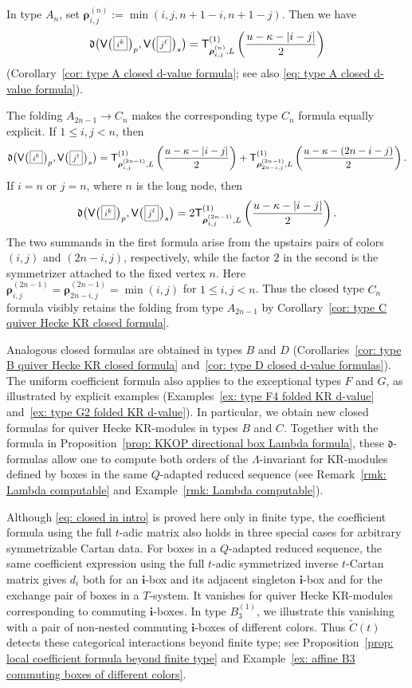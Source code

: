 \documentclass[12pt, leqno]{amsart}
\numberwithin{equation}{section}
\theoremstyle{plain}
\theoremstyle{definition}
\newcommand{\Vkm}[1]{%
  \ttV\bigl(\hspace{0.2ex}\scalebox{.8}{\(\boxed{#1}\)}\hspace{0.2ex}\bigr)%
}
\newcommand{\seteq}{\mathbin{:=}}
\newcommand{\de}{\mathfrak{d}}
\newcommand{\tC}{\widetilde{C}}
\newcommand{\sfT}{\mathsf{T}}
\newcommand{\brho}{{\boldsymbol{\rho}}}
\newcommand{\bfi}{\mathbf{i}}
\newcommand{\ttV}{\mathtt{V}}
\begin{document}
In type \(A_n\), set
\(\brho^{(n)}_{i,j}\seteq\min(i,j,n+1-i,n+1-j)\).
Then we have
\[
\de\bigl(\Vkm{i^k}_p,\Vkm{j^\ell}_s\bigr)
= \sfT^{(1)}_{\brho^{(n)}_{i,j},L} \left( \frac{u-\kappa-|i-j|}{2} \right)
\]
(Corollary~\ref{cor: type A closed d-value formula}; see
also \eqref{eq: type A closed d-value formula}).

The folding \(A_{2n-1}\longrightarrow C_n\) makes the corresponding
type \(C_n\) formula equally explicit. 
If \(1\leq i,j<n\), then
\[ 
\de\bigl(\Vkm{i^k}_p,\Vkm{j^\ell}_s\bigr)
=\sfT^{(1)}_{\brho^{(2n-1)}_{i,j},L}
\left( \frac{u-\kappa-|i-j|}{2} \right)
+\sfT^{(1)}_{\brho^{(2n-1)}_{2n-i,j},L}
\left( \frac{u-\kappa-(2n-i-j)}{2} \right).
\]
If \(i=n\) or \(j=n\), where \(n\) is the long node, then
\[
\de\bigl(\Vkm{i^k}_p,\Vkm{j^\ell}_s\bigr)
= 2\sfT^{(1)}_{\brho^{(2n-1)}_{i,j},L}
\left( \frac{u-\kappa-|i-j|}{2}
\right).
\]
The two summands in the first formula arise from the upstairs pairs
of colors \((i,j)\) and \((2n-i,j)\), respectively, while the factor
\(2\) in the second is the symmetrizer attached to the fixed vertex
\(n\).  Here
\(\brho^{(2n-1)}_{i,j}=\brho^{(2n-1)}_{2n-i,j}=\min(i,j)\)
for \(1\leq i,j<n\).  Thus the closed type
\(C_n\) formula visibly retains the folding from type \(A_{2n-1}\)
by Corollary~\ref{cor: type C quiver Hecke KR closed formula}.

Analogous closed formulas are obtained in types \(B\) and \(D\) 
(Corollaries~\ref{cor: type B quiver Hecke KR closed formula}
and~\ref{cor: type D closed d-value formulas}).
The uniform coefficient formula also applies to the exceptional
types \(F\) and \(G\), as illustrated by explicit examples 
(Examples~\ref{ex: type F4 folded KR d-value}
and~\ref{ex: type G2 folded KR d-value}).  In particular, we obtain
new closed formulas for quiver Hecke KR-modules in types \(B\) and
\(C\).
Together with the formula in
Proposition~\ref{prop: KKOP directional box Lambda formula}, these
\(\de\)-formulas allow one to compute both orders of the
\(\Lambda\)-invariant for KR-modules defined by boxes in the same
\(Q\)-adapted reduced sequence (see Remark~\ref{rmk: Lambda computable} and Example~\ref{rmk: Lambda computable}).

\smallskip

 Although \eqref{eq: closed in intro} is proved here only in
finite type, the coefficient formula using the full \(t\)-adic matrix
also holds in three special cases for arbitrary symmetrizable
Cartan data.   For boxes in a \(Q\)-adapted reduced sequence, the same coefficient
expression using the full \(t\)-adic symmetrized inverse \(t\)-Cartan
matrix gives \(d_i\) both for an \(\bfi\)-box and its adjacent singleton
\(\bfi\)-box and for the exchange pair of boxes in a \(T\)-system. 
It vanishes for quiver Hecke KR-modules corresponding to
commuting \(\bfi\)-boxes.  In type \(B_3^{(1)}\), we illustrate this vanishing with a 
pair of non-nested commuting \(\bfi\)-boxes of different colors.  Thus \(\tC(t)\)
detects these categorical interactions beyond finite
type; see Proposition~\ref{prop: local coefficient formula beyond finite type}
and Example~\ref{ex: affine B3 commuting boxes of different colors}. 
\end{document}
